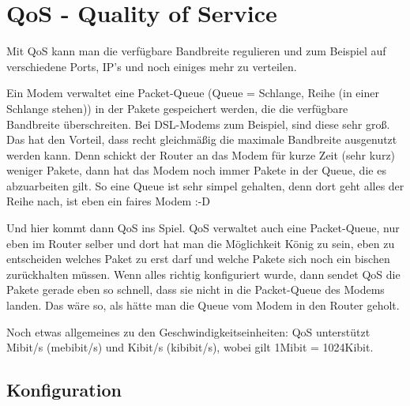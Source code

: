 
\section{QoS - Quality of Service}

   Mit QoS kann man die verfügbare Bandbreite regulieren und zum Beispiel
   auf verschiedene Ports, IP's und noch einiges mehr zu verteilen.

   Ein Modem verwaltet eine Packet-Queue (Queue = Schlange, Reihe (in
   einer Schlange stehen)) in der Pakete gespeichert werden, die die
   verfügbare Bandbreite überschreiten. Bei DSL-Modems zum Beispiel, sind
   diese sehr groß. Das hat den Vorteil, dass recht gleichmäßig die
   maximale Bandbreite ausgenutzt werden kann. Denn schickt der Router an
   das Modem für kurze Zeit (sehr kurz) weniger Pakete, dann hat das
   Modem noch immer Pakete in der Queue, die es abzuarbeiten gilt. So
   eine Queue ist sehr simpel gehalten, denn dort geht alles der Reihe
   nach, ist eben ein faires Modem :-D

   Und hier kommt dann QoS ins Spiel. QoS verwaltet auch eine
   Packet-Queue, nur eben im Router selber und dort hat man die
   Möglichkeit König zu sein, eben zu entscheiden welches Paket zu erst
   darf und welche Pakete sich noch ein bischen zurückhalten müssen. Wenn
   alles richtig konfiguriert wurde, dann sendet QoS die Pakete gerade
   eben so schnell, dass sie nicht in die Packet-Queue des Modems landen.
   Das wäre so, als hätte man die Queue vom Modem in den Router geholt.

   Noch etwas allgemeines zu den Geschwindigkeitseinheiten:
   QoS unterstützt Mibit/s (mebibit/s) und Kibit/s (kibibit/s), wobei gilt 1Mibit
   = 1024Kibit.

\subsection{Konfiguration}


